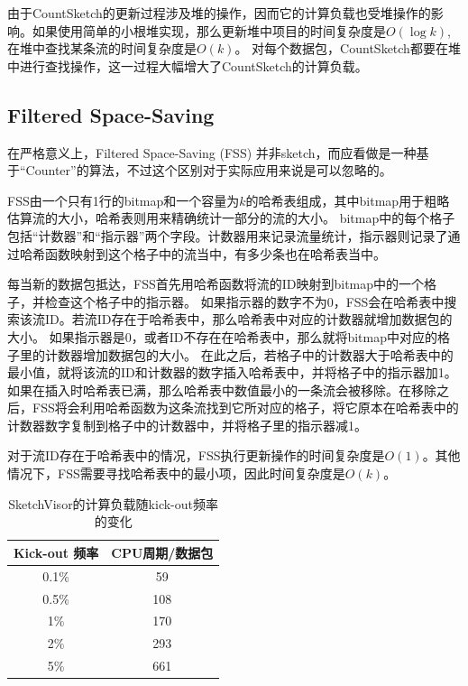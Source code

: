 由于CountSketch的更新过程涉及堆的操作，因而它的计算负载也受堆操作的影响。如果使用简单的小根堆实现，那么更新堆中项目的时间复杂度是$O(\log{k})$, 在堆中查找某条流的时间复杂度是$O(k)$。
对每个数据包，CountSketch都要在堆中进行查找操作，这一过程大幅增大了CountSketch的计算负载。



\subsection{Filtered Space-Saving \cite{homem2010finding}}\label{sec:FSS}
在严格意义上，Filtered Space-Saving (FSS) \cite{homem2010finding}并非sketch，而应看做是一种基于“Counter”的算法，不过这个区别对于实际应用来说是可以忽略的。

FSS由一个只有1行的bitmap和一个容量为$k$的哈希表组成，其中bitmap用于粗略估算流的大小，哈希表则用来精确统计一部分的流的大小。
bitmap中的每个格子包括“计数器”和“指示器”两个字段。计数器用来记录流量统计，指示器则记录了通过哈希函数映射到这个格子中的流当中，有多少条也在哈希表当中。

每当新的数据包抵达，FSS首先用哈希函数将流的ID映射到bitmap中的一个格子，并检查这个格子中的指示器。
如果指示器的数字不为0，FSS会在哈希表中搜索该流ID。若流ID存在于哈希表中，那么哈希表中对应的计数器就增加数据包的大小。
如果指示器是0，或者ID不存在在哈希表中，那么就将bitmap中对应的格子里的计数器增加数据包的大小。
在此之后，若格子中的计数器大于哈希表中的最小值，就将该流的ID和计数器的数字插入哈希表中，并将格子中的指示器加1。
如果在插入时哈希表已满，那么哈希表中数值最小的一条流会被移除。在移除之后，FSS将会利用哈希函数为这条流找到它所对应的格子，将它原本在哈希表中的计数器数字复制到格子中的计数器中，并将格子里的指示器减1。

对于流ID存在于哈希表中的情况，FSS执行更新操作的时间复杂度是$O(1)$。其他情况下，FSS需要寻找哈希表中的最小项，因此时间复杂度是$O(k)$。

\begin{table}[h]
	\centering
	\begin{tabular}{c|c}
		\hline
		Kick-out 频率 & CPU周期/数据包 \\
		\hline
		0.1\% & 59 \\
		\hline
		0.5\% & 108 \\
		\hline
		1\% & 170 \\
		\hline
		2\% & 293 \\
		\hline
		5\% & 661 \\
		\hline
	\end{tabular}
	\caption{SketchVisor的计算负载随kick-out频率的变化}\label{tbl:sketchvisor}
\end{table}

